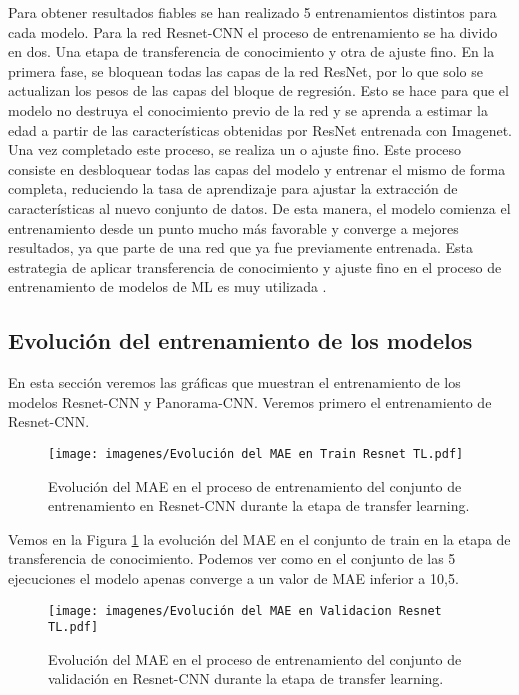 Para obtener resultados fiables se han realizado 5 entrenamientos distintos para cada modelo.
Para la red Resnet-CNN el proceso de entrenamiento se ha divido en dos. Una etapa de transferencia de conocimiento y otra de ajuste fino. En la primera fase, se bloquean todas las capas de la red ResNet, por lo que solo se actualizan los pesos de las capas del bloque de regresión. Esto se hace para que el modelo no destruya el conocimiento previo de la red y se aprenda a estimar la edad a partir de las características obtenidas por ResNet entrenada con Imagenet.
Una vez completado este proceso, se realiza un  o ajuste fino. Este proceso consiste en desbloquear todas las capas del modelo y entrenar el mismo de forma completa, reduciendo la tasa de aprendizaje para ajustar la extracción de características al nuevo conjunto de datos. De esta manera, el modelo comienza el entrenamiento desde un punto mucho más favorable y converge a mejores resultados, ya que parte de una red que ya fue previamente entrenada. Esta estrategia de aplicar transferencia de conocimiento y ajuste fino en el proceso de entrenamiento de modelos de ML es muy utilizada \cite{team}.


\subsection{Evolución del entrenamiento de los modelos}

En esta sección veremos las gráficas que muestran el entrenamiento de los modelos Resnet-CNN y Panorama-CNN. Veremos primero el entrenamiento de Resnet-CNN.

\begin{figure}[ht!]
    \centering
    \texttt{[image: imagenes/Evolución del MAE en Train Resnet TL.pdf]}
    \caption[Evolución del MAE en el conjunto de entrenamiento en Resnet-CNN durante transfer learning.]{Evolución del MAE en el proceso de entrenamiento del conjunto de entrenamiento en Resnet-CNN durante la etapa de transfer learning.}
    \label{fig:maetrainresnettl}
\end{figure}

Vemos en la Figura \ref{fig:maetrainresnettl} la evolución del MAE en el conjunto de train en la etapa de transferencia de conocimiento. Podemos ver como en el conjunto de las 5 ejecuciones el modelo apenas converge a un valor de MAE inferior a 10,5.

\begin{figure}[ht!]
    \centering
    \texttt{[image: imagenes/Evolución del MAE en Validacion Resnet TL.pdf]}
    \caption[Evolución del MAE en el conjunto de validación en Resnet-CNN durante transfer learning.]{Evolución del MAE en el proceso de entrenamiento del conjunto de validación en Resnet-CNN durante la etapa de transfer learning.}
    \label{fig:maevalresnettl}
\end{figure}

